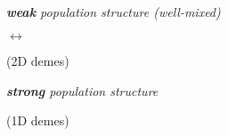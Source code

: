 \begin{figure}[h]
  \captionsetup[subfigure]{justification=raggedright}
  \begin{minipage}{\textwidth}

    \begin{minipage}{0.1\textwidth}~\end{minipage}%
    \begin{minipage}{0.25\textwidth}
      \centering
      \itshape
      {\large
      \textbf{weak} population structure
      }
      (well-mixed)
    \end{minipage}%
    \begin{minipage}{0.25\textwidth}
      \centering
      \itshape
      {\huge
      $\longleftrightarrow$
      }

      (2D demes)
    \end{minipage}%
    \begin{minipage}{0.25\textwidth}
      \centering
      \itshape
      {\large
      \textbf{strong} population structure
      }

      (1D demes)
    \end{minipage}

    ~\vspace{-0.7ex}


\end{minipage}
\end{figure}
